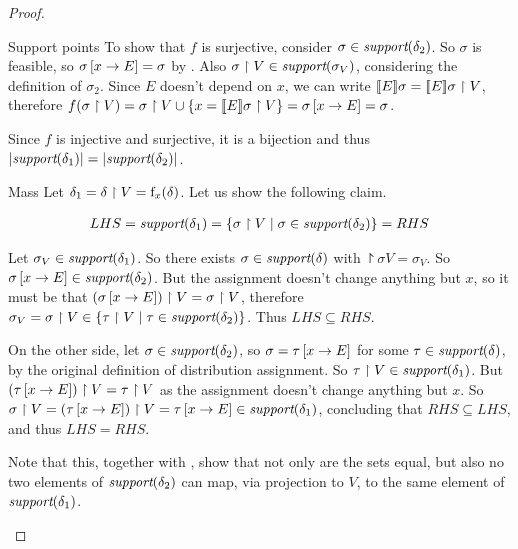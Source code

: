 \begin{proof}
\begin{subproof}{ Support points}
To show that $ f $ is surjective, consider
$ \sigma \in \textit{support}(\delta_2) $. So $ \sigma $ is feasible, so
$ \sigma \left[ x \rightarrow E \right] = \sigma $
by . Also
$ \sigma \upharpoonright V \in \textit{support}(\sigma_V) $, considering the
definition of $ \sigma_2 $. Since $ E $ doesn't depend on $ x $, we
can write $ [\![{E}]\!]{\sigma} = [\![{E}]\!]{\sigma \upharpoonright V} $,
therefore $ f(\sigma \upharpoonright V) = \sigma \upharpoonright V \cup \left\{ x
= [\![{E}]\!]{\sigma \upharpoonright V} \right\} = \sigma \left[ x \rightarrow E \right] = \sigma
$.

Since $ f $ is injective and surjective, it is a bijection and thus
$ \left| \textit{support}(\delta_1) \right| = \left| \textit{support}(\delta_2) \right| $.
\end{subproof}

\begin{subproof}{ Mass} Let $ \delta_1 =
\delta \upharpoonright V = \mathrm{f}_{x}(\delta) $. Let us show the following claim.

\begin{align}
\label{thm:pp:assign:claim2} LHS = \support{\delta_1}
= \set{\project{\sigma}{V} \given \sigma \in \support{\delta_2}} =
RHS
\end{align}

Let $ \sigma_V \in \textit{support}(\delta_1) $. So there exists
$ \sigma \in \textit{support}(\delta) $ with $ \project{\sigma}{V} = \sigma_V
$. So $ \sigma \left[ x \rightarrow E \right] \in \textit{support}(\delta_2) $. But the
assignment doesn't change anything but $ x $, so it must be that
$ \left( \sigma \left[ x \rightarrow E \right] \right) \upharpoonright V
= \sigma \upharpoonright V $, therefore
$ \sigma_V = \sigma \upharpoonright V \in \left\{ \tau \upharpoonright V \;|\; \tau \in \textit{support}(\delta_2) \right\}
$. Thus $ LHS \subseteq RHS $.

On the other side, let $ \sigma \in \textit{support}(\delta_2) $, so $ \sigma
= \tau \left[ x \rightarrow E \right] $ for some $ \tau \in \textit{support}(\delta) $, by
the original definition of distribution assignment. So
$ \tau \upharpoonright V \in \textit{support}(\delta_1) $. But
$ \left( \tau \left[ x \rightarrow E \right] \right) \upharpoonright V = \tau \upharpoonright V $ as
the assignment doesn't change anything but $ x $. So
$ \sigma \upharpoonright V
= \left( \tau \left[ x \rightarrow E \right] \right) \upharpoonright V
= \tau \left[ x \rightarrow E \right] \in \textit{support}(\delta_1) $, concluding that $
RHS \subseteq LHS $, and thus $ LHS = RHS $.

Note that this, together with , show
that not only are the sets equal, but also no two elements of
$ \textit{support}(\delta_2) $ can map, via projection to $ V $, to the same
element of $ \textit{support}(\delta_1) $.


\end{subproof}
\end{proof}
